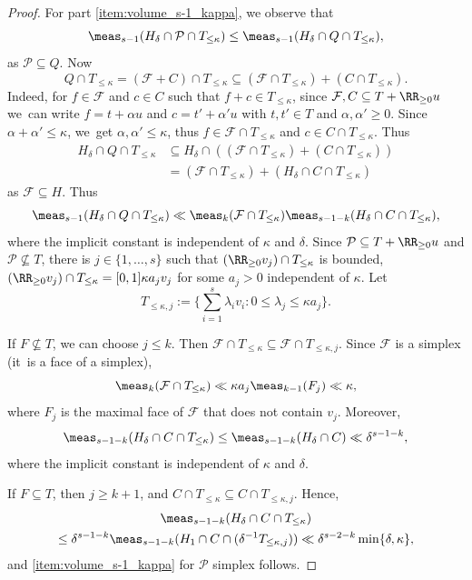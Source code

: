 \begin{proof}
For part \eqref{item:volume_s-1_kappa}, we observe that
\[
\meas_{s-1}(H_\delta\cap\mathcal P\cap T_{\leq\kappa}) \leq \meas_{s-1}(H_{\delta}\cap Q\cap T_{\leq\kappa}),
\]
as $\mathcal P\subseteq Q$.
Now
\[
Q\cap T_{\leq\kappa}= (\mathcal F+C)\cap T_{\leq\kappa}\subseteq(\mathcal F\cap T_{\leq\kappa}) + (C\cap T_{\leq\kappa}).
\]
Indeed, for $f\in \mathcal F$ and $c\in C$ such that $f+c\in T_{\leq\kappa}$, since $\mathcal F, C\subseteq T+\RR_{\geq0}u$ we~can write $f=t+\alpha u$ and $c=t'+\alpha'u$ with $t,t'\in T$ and $\alpha,\alpha'\geq 0$. Since $\alpha+\alpha'\leq \kappa$, we~get $\alpha,\alpha'\leq\kappa$, thus $f\in\mathcal F\cap T_{\leq\kappa}$ and $c\in C\cap T_{\leq\kappa}$. Thus
\begin{equation}\label{eq:volume:decomposition}
\begin{aligned}
H_{\delta}\cap Q\cap T_{\leq\kappa}
&\subseteq H_\delta\cap ((\mathcal F\cap T_{\leq\kappa}) + (C\cap T_{\leq\kappa}))\\
&= (\mathcal F\cap T_{\leq\kappa}) + (H_\delta\cap C\cap T_{\leq\kappa})
\end{aligned}
\end{equation}
as $\mathcal F\subseteq H$.
Thus
\[
\meas_{s-1}(H_{\delta}\cap Q\cap T_{\leq\kappa})
\ll \meas_k(\mathcal F\cap T_{\leq\kappa})
\meas_{s-1-k}(H_{\delta}\cap C\cap T_{\leq\kappa}),
\]
where the implicit constant is independent of $\kappa$ and $\delta$.
Since $\mathcal P\subseteq T+\RR_{\geq0} u$ and $\mathcal P\nsubseteq T$,
there is $j\in\{1,\dots,s\}$
such that $(\RR_{\geq0} v_{j})\cap T_{\leq\kappa}$ is bounded, \ie $(\RR_{\geq0} v_{j})\cap T_{\leq\kappa}=[0,1]\kappa a_{j}v_{j}$ for some
$a_{j}>0$ independent of $\kappa$.
Let \[
T_{\leq\kappa, j}:=\biggl \{\sum_{i=1}^s\lambda_i v_i:0\leq \lambda_{j}\leq \kappa a_{j} \biggr \}.
\]

If $F\not\subseteq T$, we can choose $j\leq k$. Then
$\mathcal F\cap T_{\leq\kappa}
\subseteq \mathcal F\cap T_{\leq\kappa, j}$.
Since $\mathcal F$ is a simplex (it~is a face of a simplex),
\[
\meas_k(\mathcal F\cap T_{\leq\kappa})
\ll \kappa a_{j}\meas_{k-1}(F_{j})\ll\kappa,
\]
where $F_{j}$ is the maximal face of $\mathcal F$ that does not contain $v_{j}$.
Moreover, \[
\meas_{s-1-k}(H_\delta \cap C\cap T_{\leq\kappa})
\leq \meas_{s-1-k}(H_\delta \cap C)\ll \delta^{s-1-k},
\]
where the implicit constant is independent of $\kappa$ and $\delta$.

If $F\subseteq T$, then $j\geq k+1$, and $C\cap T_{\leq\kappa} \subseteq C\cap T_{\leq\kappa, j}$.
Hence, \begin{multline*}
\meas_{s-1-k}(H_\delta\cap C\cap T_{\leq\kappa}) \\
\leq\delta^{s-1-k}\meas_{s-1-k}(H_1\cap C\cap (\delta^{-1}T_{\leq\kappa,j}))
\ll \delta^{s-2-k}\min\{\delta,\kappa\},
\end{multline*}
and \eqref{item:volume_s-1_kappa} for $\mathcal P$ simplex follows.


\end{proof}
